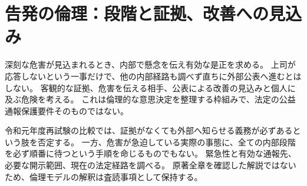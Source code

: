 \section{告発の倫理：段階と証拠、改善への見込み}
\label{theory:ethics:whistle_conditions}
深刻な危害が見込まれるとき、内部で懸念を伝え有効な是正を求める。
上司が応答しないという一事だけで、他の内部経路も調べず直ちに外部公表へ進むとはしない。
客観的な証拠、危害を伝える相手、公表による改善の見込みと個人に及ぶ危険を考える。
これは倫理的な意思決定を整理する枠組みで、法定の公益通報保護要件そのものではない。\cite{muroran_ethics_cases}

令和元年度再試験の比較では、証拠がなくても外部へ知らせる義務が必ずあるという肢を否定する。
一方、危害が急迫している実際の事態に、全ての内部段階を必ず順番に待つという手順を命じるものでもない。
緊急性と有効な通報先、必要な開示範囲、現在の法定経路を調べる。
原著全章を確認した解説ではないため、倫理モデルの解釈は査読事項として保持する。
